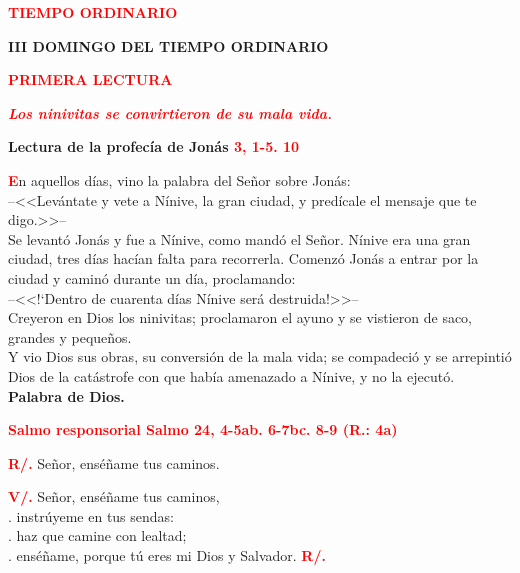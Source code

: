 \documentclass[12pt, letterpaper]{report}
\begin{document}
\begin{center}
\Large {\bfseries \textcolor{red}{TIEMPO ORDINARIO}}
\end{center}

\begin{center}
\Huge {\bfseries III DOMINGO DEL TIEMPO ORDINARIO}
\end{center}

\begin{center}
\Large {\bfseries \textcolor{red}{PRIMERA LECTURA}}
\end{center}

\begin{center}
\large {\bfseries \textit{ \textcolor{red}{Los ninivitas se convirtieron de su mala vida.}}}
\end{center}

\Large {\bfseries Lectura de la profec\'ia de Jon\'as \hspace{1cm} \textcolor{red}{3, 1-5. 10}}

\lettrine[lines=2]{\bfseries \textcolor{red}{E}}{}\Large n aquellos d\'ias, vino la palabra del Se\~nor sobre Jon\'as:\\
--<<Lev\'antate y vete a N\'inive, la gran ciudad, y pred\'icale el mensaje que te digo.>>--\\
Se levant\'o Jon\'as y fue a N\'inive, como mand\'o el Se\~nor. N\'inive era una gran ciudad, tres d\'ias hacían falta para recorrerla. Comenz\'o Jon\'as a entrar por la ciudad y camin\'o durante un d\'ia, proclamando:\\
--<<!`Dentro de cuarenta d\'ias N\'inive ser\'a destruida!>>--\\
Creyeron en Dios los ninivitas; proclamaron el ayuno y se vistieron de saco, grandes y peque\~nos.\\
Y vio Dios sus obras, su conversi\'on de la mala vida; se compadeci\'o y se arrepinti\'o Dios de la cat\'astrofe con que había amenazado a N\'inive, y no la ejecut\'o.\\

{\bfseries Palabra de Dios.}

\Large {\bfseries \textcolor{red}{Salmo responsorial \hspace{1cm} Salmo 24, 4-5ab. 6-7bc. 8-9 (R.: 4a)}}

\Large {\bfseries \textcolor{red}{R/.}} \hspace{1cm} Se\~nor, ens\'e\~name tus caminos.

{\bfseries \textcolor{red}{V/.}} \hspace{1cm} Se\~nor, ens\'e\~name tus caminos,\\
. \hspace{2.5cm} instr\'uyeme en tus sendas:\\
. \hspace{2.5cm} haz que camine con lealtad;\\
. \hspace{2.5cm} ens\'e\~name, porque t\'u eres mi Dios y Salvador.
\hspace{1cm} {\bfseries \textcolor{red}{R/.}}
\end{document}

